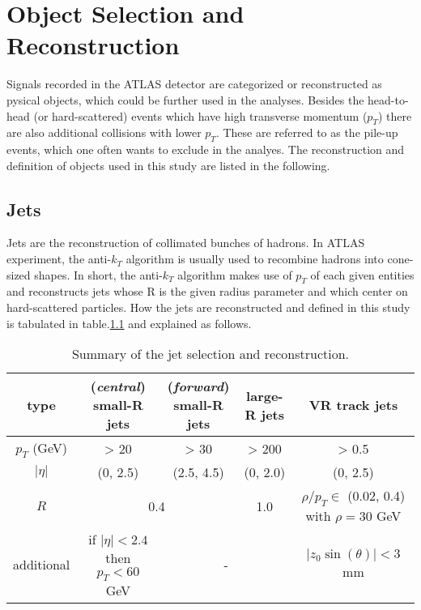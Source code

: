 \documentclass[class=NCU_thesis, crop=false]{standalone}
\begin{document}
\chapter{Object Selection and Reconstruction}
	Signals recorded in the ATLAS detector are categorized or reconstructed as pysical objects, which could be further used in the analyses. Besides the head-to-head (or hard-scattered) events which have high transverse momentum ($p_T$) there are also additional collisions with lower $p_T$. These are referred to as the pile-up events, which one often wants to exclude in the analyes. The reconstruction and definition of objects used in this study are listed in the following.
	
\section{Jets}
	Jets are the reconstruction of collimated bunches of hadrons. In ATLAS experiment, the anti-$k_T$ algorithm is usually used to recombine hadrons into cone-sized shapes. In short, the anti-$k_T$ algorithm makes use of $p_T$ of each given entities and reconstructs jets whose R is the given radius parameter and which center on hard-scattered particles. How the jets are reconstructed and defined in this study is tabulated in table.\ref{tab:jet selection} and explained as follows.
	
	\begin{table}[h]
		\centering
		\caption{Summary of the jet selection and reconstruction.}
		\label{tab:jet selection}
		\begin{tabular}{|c|c|c|c|c|}
			\hline
			type & \shortstack{(\textit{central})\\small-R jets} & \shortstack{(\textit{forward})\\small-R jets} & large-R jets & VR track jets \\ \hline
			$p_T$ (GeV) & > 20 & > 30 & > 200 & > 0.5 \\ \hline
			$\lvert \eta \rvert$ & (0, 2.5) & (2.5, 4.5) & (0, 2.0) & (0, 2.5) \\ \hline
			$R$ & \multicolumn{2}{c|}{0.4} & 1.0 & \shortstack{$\rho / p_T \in$ (0.02, 0.4)\\ with $\rho = 30$ GeV} \\ \hline
			additional & \shortstack{if $\lvert \eta \rvert < 2.4$ then\\$p_T < 60$ GeV} & \multicolumn{2}{c|}{-} & $\lvert z_0 \sin(\theta) \rvert < 3$ mm \\ \hline
		\end{tabular}
	\end{table}
	
\end{document}
